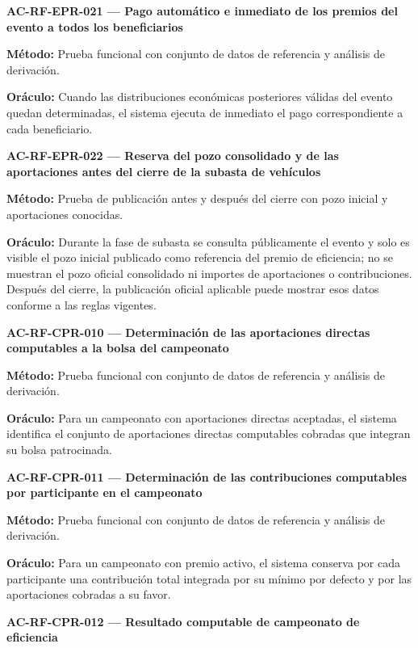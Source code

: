 \documentclass[10pt,letterpaper]{article}
\begin{document}
\noindent\textbf{AC-RF-EPR-021 --- Pago automático e inmediato de los premios del evento a todos los beneficiarios}\par
\textbf{Método:} Prueba funcional con conjunto de datos de referencia y análisis de derivación.\par
\textbf{Oráculo:} Cuando las distribuciones económicas posteriores válidas del evento quedan determinadas, el sistema ejecuta de inmediato el pago correspondiente a cada beneficiario.\par\vspace{0.45em}
\noindent\textbf{AC-RF-EPR-022 --- Reserva del pozo consolidado y de las aportaciones antes del cierre de la subasta de vehículos}\par
\textbf{Método:} Prueba de publicación antes y después del cierre con pozo inicial y aportaciones conocidas.\par
\textbf{Oráculo:} Durante la fase de subasta se consulta públicamente el evento y solo es visible el pozo inicial publicado como referencia del premio de eficiencia; no se muestran el pozo oficial consolidado ni importes de aportaciones o contribuciones. Después del cierre, la publicación oficial aplicable puede mostrar esos datos conforme a las reglas vigentes.\par\vspace{0.45em}
\noindent\textbf{AC-RF-CPR-010 --- Determinación de las aportaciones directas computables a la bolsa del campeonato}\par
\textbf{Método:} Prueba funcional con conjunto de datos de referencia y análisis de derivación.\par
\textbf{Oráculo:} Para un campeonato con aportaciones directas aceptadas, el sistema identifica el conjunto de aportaciones directas computables cobradas que integran su bolsa patrocinada.\par\vspace{0.45em}
\noindent\textbf{AC-RF-CPR-011 --- Determinación de las contribuciones computables por participante en el campeonato}\par
\textbf{Método:} Prueba funcional con conjunto de datos de referencia y análisis de derivación.\par
\textbf{Oráculo:} Para un campeonato con premio activo, el sistema conserva por cada participante una contribución total integrada por su mínimo por defecto y por las aportaciones cobradas a su favor.\par\vspace{0.45em}
\noindent\textbf{AC-RF-CPR-012 --- Resultado computable de campeonato de eficiencia}\par
\end{document}
